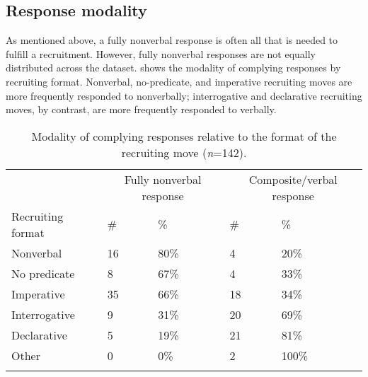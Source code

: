 \documentclass[output=paper,modfonts]{langscibook}
\begin{document}
\subsection{Response modality}\label{sec:rossi:4.1}
As mentioned above, a fully nonverbal response is often all that is needed to fulfill a recruitment. However, fully nonverbal responses are not equally distributed across the dataset.  shows the modality of complying responses by recruiting format. Nonverbal, no-predicate, and imperative recruiting moves are more frequently responded to nonverbally; interrogative and declarative recruiting moves, by contrast, are more frequently responded to verbally. 

\begin{table}
\begin{tabularx}{\textwidth}{lXXXX}
\lsptoprule
& \multicolumn{2}{c}{Fully nonverbal response} & \multicolumn{2}{c}{Composite/verbal response} \\
Recruiting format & \# & \% & \# & \% \\
\midrule
Nonverbal & 16 & 80\% & 4 & 20\% \\
No predicate & 8 & 67\% & 4 & 33\% \\
Imperative & 35	& 66\% & 18 & 34\% \\
Interrogative & 9 & 31\% & 20 & 69\% \\
Declarative & 5	& 19\% & 21 & 81\% \\
Other & 0 & 0\% & 2 & 100\% \\
\lspbottomrule
\end{tabularx}
\caption{Modality of complying responses relative to the format of the recruiting move (\textit{n}=142).}
\label{tab:rossi:3}
\end{table}

\end{document}
